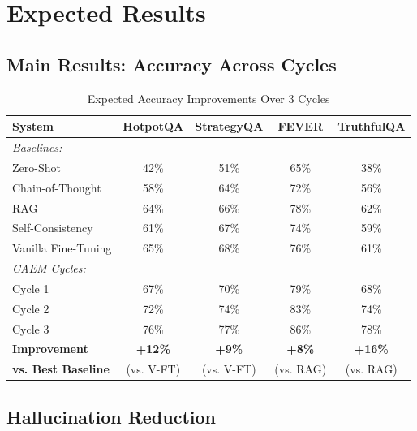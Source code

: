 \documentclass[12pt,a4paper]{article}
\theoremstyle{definition}
\begin{document}
\newpage

\section{Expected Results}

\subsection{Main Results: Accuracy Across Cycles}

\begin{table}[htbp]
\centering
\caption{Expected Accuracy Improvements Over 3 Cycles}
\begin{tabular}{lcccc}
\toprule
\textbf{System} & \textbf{HotpotQA} & \textbf{StrategyQA} & \textbf{FEVER} & \textbf{TruthfulQA} \\
\midrule
\multicolumn{5}{l}{\textit{Baselines:}} \\
Zero-Shot & 42\% & 51\% & 65\% & 38\% \\
Chain-of-Thought & 58\% & 64\% & 72\% & 56\% \\
RAG & 64\% & 66\% & 78\% & 62\% \\
Self-Consistency & 61\% & 67\% & 74\% & 59\% \\
Vanilla Fine-Tuning & 65\% & 68\% & 76\% & 61\% \\
\midrule
\multicolumn{5}{l}{\textit{CAEM Cycles:}} \\
Cycle 1 & 67\% & 70\% & 79\% & 68\% \\
Cycle 2 & 72\% & 74\% & 83\% & 74\% \\
Cycle 3 & 76\% & 77\% & 86\% & 78\% \\
\midrule
\textbf{Improvement} & \textbf{+12\%} & \textbf{+9\%} & \textbf{+8\%} & \textbf{+16\%} \\
\textbf{vs. Best Baseline} & (vs. V-FT) & (vs. V-FT) & (vs. RAG) & (vs. RAG) \\
\bottomrule
\end{tabular}
\end{table}

\subsection{Hallucination Reduction}
\end{document}
